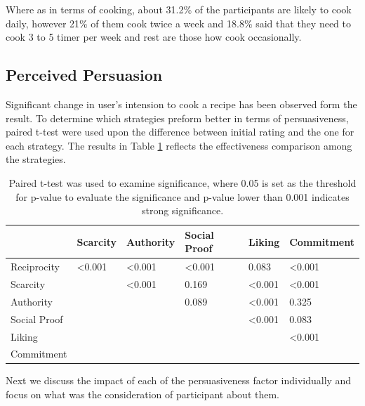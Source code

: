 Where as in terms of cooking, about 31.2\% of the participants are likely to cook daily, however 21\% of them cook twice a week and 18.8\% said that they need to cook 3 to 5 timer per week and rest are those how cook occasionally.
\subsection{Perceived Persuasion}
Significant change in user’s intension to cook a recipe has been observed form the result. To determine which strategies preform better in terms of persuasiveness, paired t-test were used upon the difference between initial rating and the one for each strategy. The results in Table \ref{table:persusasion-result} reflects the effectiveness comparison among the strategies. 
\begin{table}[ht]
	\centering %
	\begin{tabular}{p{2cm} p{2cm} p{2cm} p{2cm} p{2cm} p{2cm}}
		\hline\hline %
		& Scarcity & Authority & Social Proof & Liking & Commitment\\ %
		\hline %
		Reciprocity   & <0.001  & <0.001 & <0.001 &  0.083 & <0.001 \\ %
		Scarcity      &         & <0.001 &  0.169 & <0.001 & <0.001 \\
		Authority     &         &        &  0.089 & <0.001 &  0.325 \\
		Social Proof  &         &        &        & <0.001 &  0.083 \\
		Liking        &         &        &        &        & <0.001 \\
		Commitment    &         &        &        &        &  \\ [1ex] %
		\hline %
	\end{tabular}
	\caption{Paired t-test was used to examine significance, where 0.05 is set as the threshold for p-value to evaluate the significance and p-value lower than 0.001 indicates strong significance.}
	\label{table:persusasion-result}
\end{table}

Next we discuss the impact of each of the persuasiveness factor individually and focus on what was the consideration of participant about them.\newline
